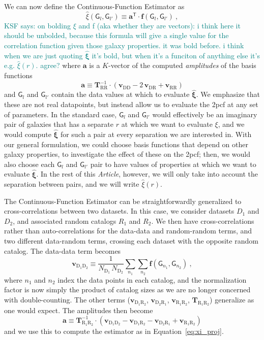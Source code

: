 \documentclass[modern]{aastex62}
\newcommand{\cf}{2pcf\xspace} %
\newcommand{\Est}{The Continuous-Function Estimator\xspace}
\newcommand{\est}{the Continuous-Function Estimator\xspace}
\newcommand{\documentname}{\textsl{Article}\xspace}
\newcommand{\inv}{^{-1}}
\newcommand{\T}{^{\mathsf{T}}}
\newcommand{\bld}[1]{\bm{#1}} %
\newcommand{\vv}[1]{\bld{v}_\mathrm{#1}}
\newcommand{\TT}[1]{\bld{T}_\mathrm{#1}}
\newcommand{\ff}{\bld{f}}
\newcommand{\NN}[1]{N_\mathrm{#1}}
\newcommand{\GG}[1]{\mathsf{G}_{#1}}
\newcommand{\KSF}[1]{\textcolor{teal}{KSF says: #1}}
\begin{document}
We can now define \est as
\begin{equation}
    \hat{\xi}(\GG{l}, \GG{l'}) \equiv \bld{a}\T \cdot \ff(\GG{l}, \GG{l'}) \label{eq:xi_proj} ~,
\end{equation}
\KSF{on bolding $\xi$ and f (aka whether they are vectors): i think here it should be unbolded, because this formula will give a single value for the correlation function given those galaxy properties. it was bold before. i think when we are just quoting $\bld{\hat{\xi}}$ it's bold, but when it's a funciton of anything else it's e.g. $\hat{\xi}(r)$. agree?}
where $\bld{a}$ is a $K$-vector of the computed \emph{amplitudes} of the basis functions
\begin{equation}
    \bld{a} \equiv \TT{RR}\inv \cdot (\vv{DD} - 2\,\vv{DR} + \vv{RR}) \label{eq:amplitude}
\end{equation}
and $\GG{l}$ and $\GG{l'}$ contain the data values at which to evaluate $\bld{\hat{\xi}}$.
We emphasize that these are not real datapoints, but instead allow us to evaluate the \cf at any set of parameters.
In the standard case, $\GG{l}$ and $\GG{l'}$ would effectively be an imaginary pair of galaxies that has a separate $r$ at which we want to evaluate $\xi$, and we would compute $\bld{\hat{\xi}}$ for such a pair at every separation we are interested in.
With our general formulation, we could choose basis functions that depend on other galaxy properties, to investigate the effect of these on the \cf; then, we would also choose each $\GG{l}$ and $\GG{l'}$ pair to have values of properties at which we want to evaluate $\bld{\hat{\xi}}$. 
In the rest of this \documentname, however, we will only take into account the separation between pairs, and we will write $\hat{\xi}(r)$.

\Est can be straightforwardly generalized to cross-correlations between two datasets.
In this case, we consider datasets $D_1$ and $D_2$, and associated random catalogs $R_1$ and $R_2$. 
We then have cross-correlations rather than auto-correlations for the data-data and random-random terms, and two different data-random terms, crossing each dataset with the opposite random catalog. 
The data-data term becomes 
\begin{equation}
    \vv{D_1 D_2} \equiv \frac{1}{\NN{D_1}\,\NN{D_2}} \sum_{n_1} \sum_{n_2} \ff(\GG{n_1}, \GG{n_2}) ~,
\end{equation}
where $n_1$ and $n_2$ index the data points in each catalog, and the normalization factor is now simply the product of catalog sizes as we are no longer concerned with double-counting.
The other terms ($\vv{D_1 R_2}$, $\vv{D_2 R_1}$, $\vv{R_1 R_2}$, $\TT{R_1 R_2}$) generalize as one would expect.
The amplitudes then become
\begin{equation}\displaystyle
    \bld{a} \equiv \TT{R_1 R_2}\inv \cdot (\vv{D_1 D_2} - \vv{D_1 R_2} - \vv{D_2 R_1} + \vv{R_1 R_2})
 \end{equation}
and we use this to compute the estimator as in Equation~\ref{eq:xi_proj}.
\end{document}

